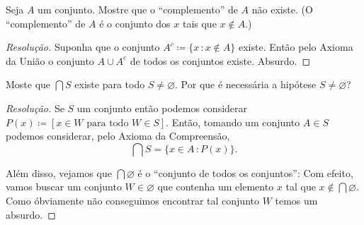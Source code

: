 \documentclass[a4paper]{article}
\begin{document}
\begin{exercicio}
 Seja \(A\) um conjunto. Mostre que o ``complemento'' de \(A\) não existe. (O
 ``complemento'' de \(A\) é o conjunto dos \(x\) tais que \(x\not\in A\).) 
\end{exercicio}
\begin{proof}[Resolução]
Suponha que o conjunto \(A^c\coloneqq \{x\,\colon x\not\in A\}\) existe. Então
pelo Axioma da União o conjunto \(A\cup A^c\) de todos os conjuntos existe. Absurdo.
\end{proof}
\begin{exercicio}
Moste que \(\bigcap S\) existe para todo \(S\not=\varnothing\). Por que é
necessária a hipótese \(S\not=\varnothing\)?
\end{exercicio}
\begin{proof}[Resolução]
  Se \(S\) um conjunto então podemos considerar
  \(P(x)\coloneqq [x\in W \text{ para todo } W\in S].\)
  Então, tomando um conjunto \(A\in S\) podemos considerar, pelo Axioma da Compreensão,
  \[\bigcap S = \{x\in A\,\colon P(x)\}.\]

  Além disso, vejamos que \(\bigcap \varnothing\) é o ``conjunto de todos os
  conjuntos'': Com efeito, vamos buscar um conjunto \(W\in \varnothing\) que contenha
  um elemento \(x\) tal que  \(x\not\in\bigcap\varnothing.\) Como óbviamente não
  conseguimos encontrar tal conjunto \(W\) temos um absurdo.
\end{proof}
\end{document}
